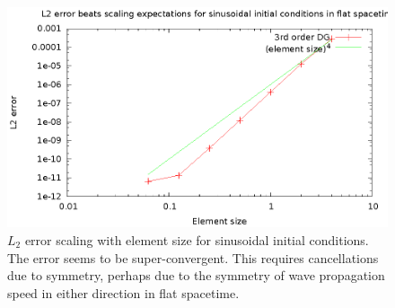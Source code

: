 \begin{figure}
  \includegraphics{sinL2WTelement}
  \caption{$L_2$ error scaling with element size for sinusoidal initial conditions. The error seems to be super-convergent. This requires cancellations due to symmetry, perhaps due to the symmetry of wave propagation speed in either direction in flat spacetime.}
  \label{scalingelement}
\end{figure}


